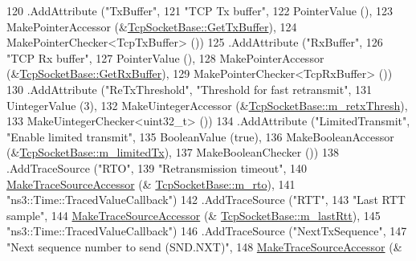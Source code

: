 \begin{DoxyCode}
120     .AddAttribute (\textcolor{stringliteral}{"TxBuffer"},
121                    \textcolor{stringliteral}{"TCP Tx buffer"},
122                    PointerValue (),
123                    MakePointerAccessor (&\hyperlink{classns3_1_1TcpSocketBase_aea4dd16496e03e7cc96d0ed8c51256fa}{TcpSocketBase::GetTxBuffer}),
124                    MakePointerChecker<TcpTxBuffer> ())
125     .AddAttribute (\textcolor{stringliteral}{"RxBuffer"},
126                    \textcolor{stringliteral}{"TCP Rx buffer"},
127                    PointerValue (),
128                    MakePointerAccessor (&\hyperlink{classns3_1_1TcpSocketBase_a4107fd640582c5e35641994386e11b55}{TcpSocketBase::GetRxBuffer}),
129                    MakePointerChecker<TcpRxBuffer> ())
130     .AddAttribute (\textcolor{stringliteral}{"ReTxThreshold"}, \textcolor{stringliteral}{"Threshold for fast retransmit"},
131                    UintegerValue (3),
132                    MakeUintegerAccessor (&\hyperlink{classns3_1_1TcpSocketBase_aea5678454b966c263c6f72f174e6e328}{TcpSocketBase::m\_retxThresh}),
133                    MakeUintegerChecker<uint32\_t> ())
134     .AddAttribute (\textcolor{stringliteral}{"LimitedTransmit"}, \textcolor{stringliteral}{"Enable limited transmit"},
135                    BooleanValue (\textcolor{keyword}{true}),
136                    MakeBooleanAccessor (&\hyperlink{classns3_1_1TcpSocketBase_a676649ad67ed68ec06a1a87a6acd6693}{TcpSocketBase::m\_limitedTx}),
137                    MakeBooleanChecker ())
138     .AddTraceSource (\textcolor{stringliteral}{"RTO"},
139                      \textcolor{stringliteral}{"Retransmission timeout"},
140                      \hyperlink{group__tracing_gab21a770b9855af4e8f69f7531ea4a6b0}{MakeTraceSourceAccessor} (&
      \hyperlink{classns3_1_1TcpSocketBase_a47788384a59ae230896377ceab6829d4}{TcpSocketBase::m\_rto}),
141                      \textcolor{stringliteral}{"ns3::Time::TracedValueCallback"})
142     .AddTraceSource (\textcolor{stringliteral}{"RTT"},
143                      \textcolor{stringliteral}{"Last RTT sample"},
144                      \hyperlink{group__tracing_gab21a770b9855af4e8f69f7531ea4a6b0}{MakeTraceSourceAccessor} (&
      \hyperlink{classns3_1_1TcpSocketBase_a6c48fbea019c593b975bd1d5f5c95dde}{TcpSocketBase::m\_lastRtt}),
145                      \textcolor{stringliteral}{"ns3::Time::TracedValueCallback"})
146     .AddTraceSource (\textcolor{stringliteral}{"NextTxSequence"},
147                      \textcolor{stringliteral}{"Next sequence number to send (SND.NXT)"},
148                      \hyperlink{group__tracing_gab21a770b9855af4e8f69f7531ea4a6b0}{MakeTraceSourceAccessor} (&

\end{DoxyCode}
